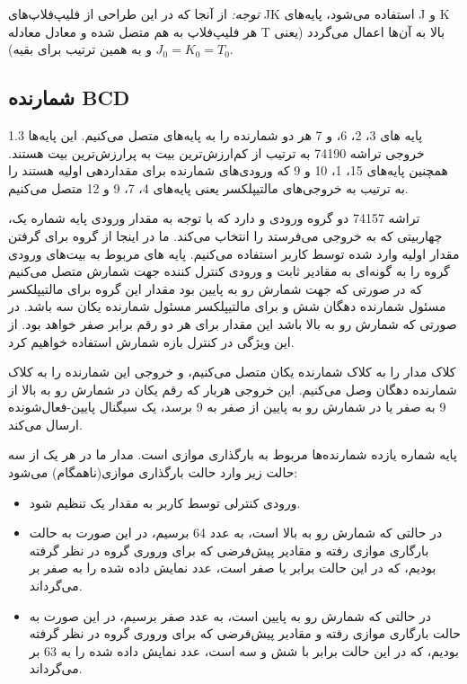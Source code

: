 \documentclass[a4paper,12pt]{article}
\numberwithin{figure}{subsection}
\begin{document}
\textit{توجه:} از آنجا که در این طراحی از فلیپ‌فلاپ‌های JK استفاده می‌شود، پایه‌های J و K هر فلیپ‌فلاپ به هم متصل شده و معادل معادله T بالا به آن‌ها اعمال می‌گردد (یعنی $J_0=K_0=T_0$ و به همین ترتیب برای بقیه).

\subsection{شمارنده BCD}
\leavevmode\par
\vspace{0.2cm}

\begin{spacing}{1.3}
پایه های 3، 2، 6، و 7 هر دو شمارنده را به پایه‌های  متصل می‌کنیم. این پایه‌ها خروجی تراشه 74190 به ترتیب از کم‌ارزش‌ترین بیت به پر‌ارزش‌ترین بیت هستند. همچنین پایه‌های 15، 1، 10 و 9 که ورودی‌های شمارنده برای مقداردهی اولیه هستند را به ترتیب به خروجی‌های مالتیپلکسر یعنی پایه‌های 4، 7، 9 و 12 متصل می‌کنیم.

تراشه 74157 دو گروه ورودی  و  دارد که با توجه به مقدار ورودی پایه شماره یک، چهاربیتی که به خروجی می‌فرستد را انتخاب می‌کند. ما در اینجا از گروه  برای گرفتن مقدار اولیه وارد شده توسط کاربر استفاده می‌کنیم. پایه های مربوط به بیت‌های ورودی گروه  را به گونه‌ای به مقادیر ثابت و ورودی کنترل کننده جهت شمارش متصل می‌کنیم که در صورتی که جهت شمارش رو به پایین بود مقدار این گروه برای مالتیپلکسر مسئول شمارنده دهگان شش و برای مالتیپلکسر مسئول شمارنده یکان سه باشد. در صورتی که شمارش رو به بالا باشد این مقدار برای هر دو رقم برابر صفر خواهد بود. از این ویژگی در کنترل بازه شمارش استفاده خواهیم کرد.

کلاک مدار را به کلاک شمارنده یکان متصل می‌کنیم، و خروجی  این شمارنده را به کلاک شمارنده دهگان وصل می‌کنیم. این خروجی هربار که رقم یکان در شمارش رو به بالا از 9 به صفر یا در شمارش رو به پایین از صفر به 9 برسد، یک سیگنال پایین-فعال‌شونده ارسال می‌کند.

پایه شماره یازده شمارنده‌ها مربوط به بارگذاری موازی است. مدار ما در هر یک از سه حالت زیر وارد حالت بارگذاری موازی(ناهمگام) می‌شود:
\end{spacing}

\vspace{-0.2cm}

\begin{itemize}
\item ورودی کنترلی  توسط کاربر به مقدار یک تنظیم شود.
\item در حالتی که شمارش رو به بالا است، به عدد 64 برسیم، در این صورت به حالت بارگاری موازی رفته و مقادیر پیش‌فرضی که برای وروری گروه  در نظر گرفته بودیم، که در این حالت برابر با صفر است، عدد نمایش داده شده را به صفر بر می‌گرداند.
\item در حالتی که شمارش رو به پایین است، به عدد صفر برسیم، در این صورت به حالت بارگاری موازی رفته و مقادیر پیش‌فرضی که برای وروری گروه  در نظر گرفته بودیم، که در این حالت برابر با شش و سه است، عدد نمایش داده شده را به 63 بر می‌گرداند.
\end{itemize}
\end{document}
